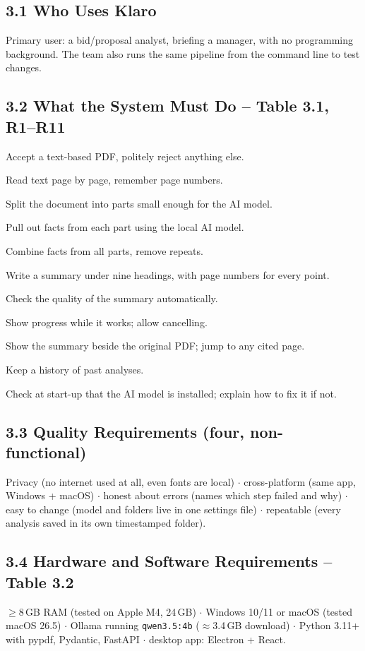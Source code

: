 \documentclass[11pt,a4paper]{article}
\begin{document}
\subsection*{3.1 Who Uses Klaro}
Primary user: a bid/proposal analyst, briefing a manager, with no programming background. The team
also runs the same pipeline from the command line to test changes.

\subsection*{3.2 What the System Must Do -- Table 3.1, R1--R11}
\begin{description}[leftmargin=1.2cm,style=nextline]
  \item[R1] Accept a text-based PDF, politely reject anything else.
  \item[R2] Read text page by page, remember page numbers.
  \item[R3] Split the document into parts small enough for the AI model.
  \item[R4] Pull out facts from each part using the local AI model.
  \item[R5] Combine facts from all parts, remove repeats.
  \item[R6] Write a summary under nine headings, with page numbers for every point.
  \item[R7] Check the quality of the summary automatically.
  \item[R8] Show progress while it works; allow cancelling.
  \item[R9] Show the summary beside the original PDF; jump to any cited page.
  \item[R10] Keep a history of past analyses.
  \item[R11] Check at start-up that the AI model is installed; explain how to fix it if not.
\end{description}

\subsection*{3.3 Quality Requirements (four, non-functional)}
Privacy (no internet used at all, even fonts are local) $\cdot$ cross-platform (same app, Windows +
macOS) $\cdot$ honest about errors (names which step failed and why) $\cdot$ easy to change (model
and folders live in one settings file) $\cdot$ repeatable (every analysis saved in its own timestamped
folder).

\subsection*{3.4 Hardware and Software Requirements -- Table 3.2}
\begin{keynums}
$\geq$8\,GB RAM (tested on Apple M4, 24\,GB) $\cdot$ Windows 10/11 or macOS (tested macOS 26.5) $\cdot$
Ollama running \texttt{qwen3.5:4b} ($\approx$3.4\,GB download) $\cdot$ Python 3.11+ with pypdf,
Pydantic, FastAPI $\cdot$ desktop app: Electron + React.
\end{keynums}
\end{document}
